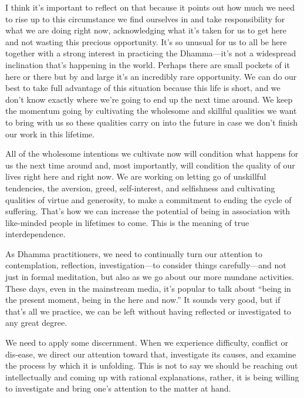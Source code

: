 I think it's important to reflect on that because it points out how 
much we need to rise up to this circumstance we find ourselves in and 
take responsibility for what we are doing right now, acknowledging what 
it's taken for us to get here and not wasting this precious 
opportunity. It's so unusual for us to all be here together with a 
strong interest in practicing the Dhamma---it's not a widespread 
inclination that's happening in the world. Perhaps there are small 
pockets of it here or there but by and large it's an incredibly rare 
opportunity. We can do our best to take full advantage of this 
situation because this life is short, and we don't know exactly where 
we're going to end up the next time around. We keep the momentum going 
by cultivating the wholesome and skillful qualities we want to bring 
with us so these qualities carry on into the future in case we don't 
finish our work in this lifetime.

All of the wholesome intentions we cultivate now will condition what 
happens for us the next time around and, most importantly, will 
condition the quality of our lives right here and right now. We are 
working on letting go of unskillful tendencies, the aversion, greed, 
self-interest, and selfishness and cultivating qualities of virtue and 
generosity, to make a commitment to ending the cycle of suffering. 
That's how we can increase the potential of being in association with 
like-minded people in lifetimes to come. This is the meaning of true 
interdependence.


As Dhamma practitioners, we need to continually turn our attention to 
contemplation, reflection, investigation---to consider things 
carefully---and not just in formal meditation, but also as we go about 
our more mundane activities. These days, even in the mainstream media, 
it's popular to talk about ``being in the present moment, being in the 
here and now.'' It sounds very good, but if that's all we practice, we 
can be left without having reflected or investigated to any great 
degree.

We need to apply some discernment. When we experience difficulty, 
conflict or dis-ease, we direct our attention toward that, investigate 
its causes, and examine the process by which it is unfolding. This is 
not to say we should be reaching out intellectually and coming up with 
rational explanations, rather, it is being willing to investigate and 
bring one's attention to the matter at hand.

